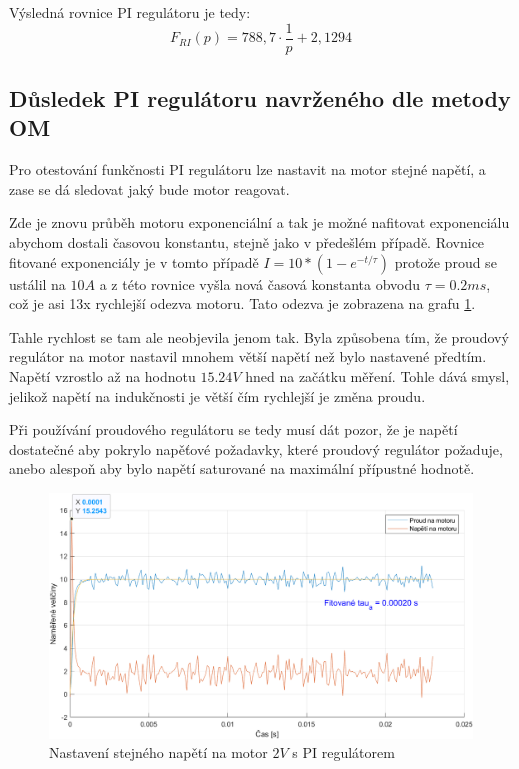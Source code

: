 \documentclass{protokol}
\begin{document}
Výsledná rovnice PI regulátoru je tedy:
\begin{equation}
    F_{RI}(p) = 788,7\cdot{}\frac{1}{p} + 2,1294
\end{equation}

\subsection{Důsledek PI regulátoru navrženého dle metody OM}

Pro otestování funkčnosti PI regulátoru lze nastavit na motor stejné napětí, a zase se dá sledovat jaký bude motor reagovat.

Zde je znovu průběh motoru exponenciální a tak je možné nafitovat exponenciálu abychom dostali časovou konstantu, stejně jako v předešlém případě. Rovnice fitované exponenciály je v tomto případě $I = 10*(1-e^{-t/\tau{}})$ protože proud se ustálil na $10A$ a z této rovnice vyšla nová časová konstanta obvodu $\tau = 0.2ms$, což je asi 13x rychlejší odezva motoru. Tato odezva je zobrazena na grafu \ref{fig:DusledekPIRegulatoru}.

Tahle rychlost se tam ale neobjevila jenom tak. Byla způsobena tím, že proudový regulátor na motor nastavil mnohem větší napětí než bylo nastavené předtím. Napětí vzrostlo až na hodnotu $15.24V$ hned na začátku měření. Tohle dává smysl, jelikož napětí na indukčnosti je větší čím rychlejší je změna proudu.

Při používání proudového regulátoru se tedy musí dát pozor, že je napětí dostatečné aby pokrylo napěťové požadavky, které proudový regulátor požaduje, anebo alespoň aby bylo napětí saturované na maximální přípustné hodnotě. 

\begin{figure}[H]
    \centering
    \includegraphics[width=1\linewidth]{DusledekPIRegulatoru.png}
    \caption{Nastavení stejného napětí na motor $2V$ s PI regulátorem}
    \label{fig:DusledekPIRegulatoru}
\end{figure}
\end{document}
